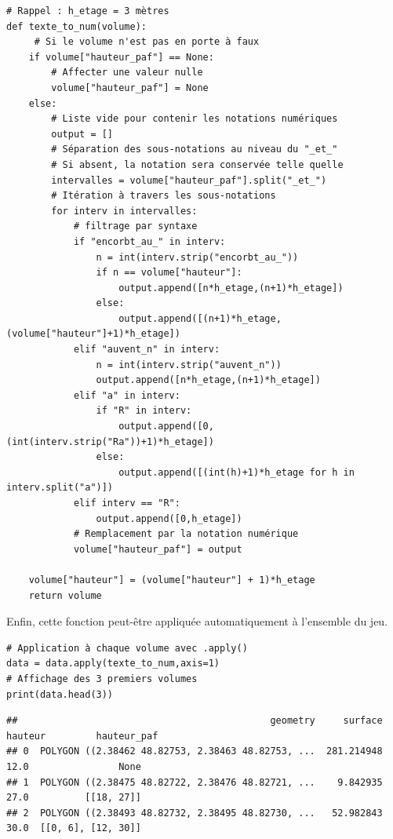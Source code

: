 \documentclass[
  11pt,
  french,
]{article}
\begin{document}
\begin{tcolorbox}[title= Fonction à appliquer à l'ensemble des volumes ,colback=boitecode]
\begin{lstlisting}[style=code]
# Rappel : h_etage = 3 mètres
def texte_to_num(volume):
     # Si le volume n'est pas en porte à faux
    if volume["hauteur_paf"] == None:
        # Affecter une valeur nulle
        volume["hauteur_paf"] = None
    else:
        # Liste vide pour contenir les notations numériques
        output = []
        # Séparation des sous-notations au niveau du "_et_"
        # Si absent, la notation sera conservée telle quelle
        intervalles = volume["hauteur_paf"].split("_et_")
        # Itération à travers les sous-notations
        for interv in intervalles:
            # filtrage par syntaxe
            if "encorbt_au_" in interv:
                n = int(interv.strip("encorbt_au_"))
                if n == volume["hauteur"]:
                    output.append([n*h_etage,(n+1)*h_etage])
                else:
                    output.append([(n+1)*h_etage,(volume["hauteur"]+1)*h_etage])
            elif "auvent_n" in interv:
                n = int(interv.strip("auvent_n"))
                output.append([n*h_etage,(n+1)*h_etage])
            elif "a" in interv:
                if "R" in interv:
                    output.append([0,(int(interv.strip("Ra"))+1)*h_etage])
                else:
                    output.append([(int(h)+1)*h_etage for h in interv.split("a")])
            elif interv == "R":
                output.append([0,h_etage])
            # Remplacement par la notation numérique
            volume["hauteur_paf"] = output

    volume["hauteur"] = (volume["hauteur"] + 1)*h_etage
    return volume\end{lstlisting}
\end{tcolorbox}

Enfin, cette fonction peut-être appliquée automatiquement à l'ensemble
du jeu.

\begin{tcolorbox}[title= Application de la fonction sur le jeu de données ,colback=boitecode]
\begin{lstlisting}[style=code]
# Application à chaque volume avec .apply()
data = data.apply(texte_to_num,axis=1)
# Affichage des 3 premiers volumes
print(data.head(3))\end{lstlisting}
\begin{lstlisting}[style=out]
##                                             geometry     surface  hauteur         hauteur_paf
## 0  POLYGON ((2.38462 48.82753, 2.38463 48.82753, ...  281.214948     12.0                None
## 1  POLYGON ((2.38475 48.82722, 2.38476 48.82721, ...    9.842935     27.0          [[18, 27]]
## 2  POLYGON ((2.38493 48.82732, 2.38495 48.82730, ...   52.982843     30.0  [[0, 6], [12, 30]]
\end{lstlisting}
\end{tcolorbox}
\end{document}
